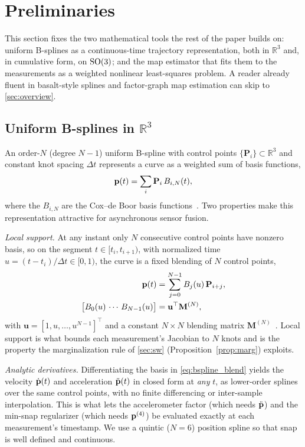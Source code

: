 \section{Preliminaries}
\label{sec:prelim}

This section fixes the two mathematical tools the rest of the paper
builds on: uniform B-splines as a continuous-time trajectory
representation, both in $\mathbb{R}^3$ and, in cumulative form, on
$\mathrm{SO}(3)$; and the \ac{map} estimator that fits them to the measurements as
a weighted nonlinear least-squares problem.  A reader already fluent in
basalt-style splines and factor-graph \ac{map} estimation can skip to
\autoref{sec:overview}.

\subsection{Uniform B-splines in $\mathbb{R}^3$}
\label{sec:prelim_bspline}
An order-$N$ (degree $N{-}1$) uniform B-spline with control points
$\{\mathbf{P}_i\}\subset\mathbb{R}^3$ and constant knot spacing $\Delta t$
represents a curve as a weighted sum of basis functions,
\begin{equation}
  \mathbf{p}(t) = \sum_i \mathbf{P}_i\, B_{i,N}(t),
  \label{eq:bspline_def}
\end{equation}
where the $B_{i,N}$ are the Cox--de Boor basis
functions~\cite{furgale2013unified}.  Two properties make this
representation attractive for asynchronous sensor fusion.

\emph{Local support.}  At any instant only $N$ consecutive control
points have nonzero basis, so on the segment $t\in[t_i,t_{i+1})$, with
normalized time $u=(t-t_i)/\Delta t\in[0,1)$, the curve is a fixed
blending of $N$ control points,
\begin{equation}
  \begin{aligned}
  \mathbf{p}(t) &= \sum_{j=0}^{N-1} B_j(u)\,\mathbf{P}_{i+j}, \\
  \bigl[B_0(u)\,\cdots\,B_{N-1}(u)\bigr]
     &= \mathbf{u}^{\top}\mathbf{M}^{(N)},
  \end{aligned}
  \label{eq:bspline_blend}
\end{equation}
with $\mathbf{u}=[1,u,\dots,u^{N-1}]^{\top}$ and a constant $N\times N$
blending matrix $\mathbf{M}^{(N)}$~\cite{usenko2020basalt}.  Local
support is what bounds each measurement's Jacobian to $N$ knots and is
the property the marginalization rule of \autoref{sec:sw}
(Proposition~\ref{prop:marg}) exploits.

\emph{Analytic derivatives.}  Differentiating the basis in
\eqref{eq:bspline_blend} yields the velocity $\dot{\mathbf{p}}(t)$ and
acceleration $\ddot{\mathbf{p}}(t)$ in closed form at \emph{any} $t$, as
lower-order splines over the same control points, with no finite
differencing or inter-sample interpolation.  This is what lets the
accelerometer factor (which needs $\ddot{\mathbf{p}}$) and the min-snap
regularizer (which needs $\mathbf{p}^{(4)}$) be evaluated exactly at each
measurement's timestamp.  We use a quintic ($N{=}6$) position spline so
that snap is well defined and continuous.

